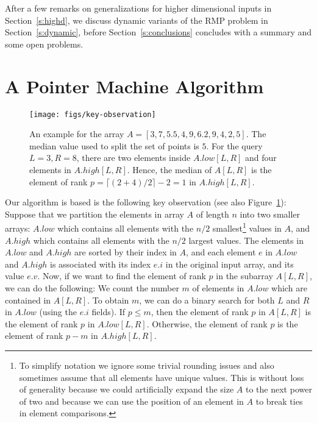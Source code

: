 \documentclass[a4paper,10pt]{article}
\newcommand{\rank}{p}
\begin{document}
After a few remarks on generalizations for higher dimensional inputs
in Section~\ref{s:highd}, we discuss dynamic variants of the RMP problem in Section~\ref{s:dynamic}, before Section~\ref{s:conclusions} concludes with a
summary and some open problems.



\section{A Pointer Machine Algorithm}
\label{s:pointermachine}

\begin{figure}
\begin{center}
\texttt{[image: figs/key-observation]}
\end{center}
\caption{An example for the array $A=[3,7,5.5,4,9,6.2,9,4,2,5]$.
The median value used to split the set of points is $5$. For the query $L=3,R=8$, there are two elements inside $A.low[L,R]$ and four elements in $A.high[L,R]$. Hence, the median of $A[L,R]$ is the element of rank $ \rank = \lceil(2+4)/2 \rceil - 2 = 1$ in $A.high[L,R]$. }
\label{fig:key-observation}
\end{figure}

Our algorithm is based is the following key observation
(see also Figure~\ref{fig:key-observation}): Suppose that we partition
the elements in array $A$ of length $n$ into two smaller arrays:
$A.low$ which contains all elements with the $n/2$
smallest\footnote{To simplify
  notation we ignore some trivial rounding issues and also sometimes
  assume that all elements have unique values. This is without loss of
  generality because we could artificially expand the size $A$ to the next power of two and
  because we can use the position of an element in $A$ to break ties in element comparisons.} values in $A$, and $A.high$ which contains all elements with the
$n/2$ largest values. The elements in $A.low$ and $A.high$ are sorted
by their index in $A$, and each element $e$ in $A.low$ and $A.high$ is
associated with its index $e.i$ in the original input array, and its value $e.v$.  Now, if
we want to find the element of rank $\rank$ in the subarray $A[L,R]$,
we can do the following: We count the number $m$ of elements in $A.low$
which are contained in $A[L,R]$.  To obtain $m$, we can do a binary
search for both $L$ and $R$ in $A.low$ (using the $e.i$ fields).  If
$\rank\leq m$, then the element of rank $\rank$ in $A[L,R]$ is
 the element of rank $\rank$ in $A.low[L,R]$. Otherwise, the
element of rank $\rank$ is  the element of rank $\rank-m$ in
$A.high[L,R]$.
\end{document}
